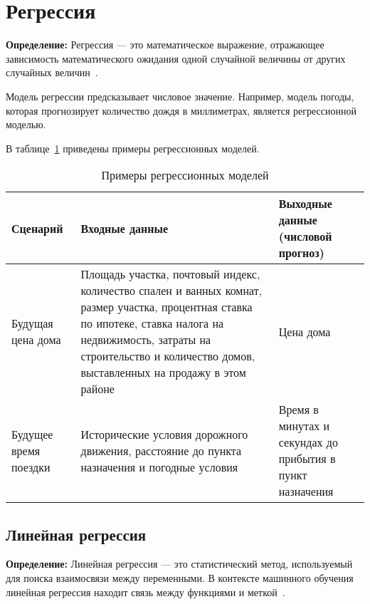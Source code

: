 \section{Регрессия}

\textbf{ Определение:} Регрессия --- это математическое выражение, отражающее зависимость математического ожидания одной случайной величины от других случайных величин~\cite{kemer}.

Модель регрессии предсказывает числовое значение.
Например, модель погоды, которая прогнозирует количество дождя в миллиметрах, является регрессионной моделью.

В таблице~\ref{tab:tabl1} приведены примеры регрессионных моделей.

\begin{table}[ht]
    \centering
    \caption{Примеры регрессионных моделей}
    \begin{tabularx}{\textwidth}{|X|X|X|}
        \hline
        Сценарий & Входные данные & Выходные данные \newline(числовой прогноз) \\
        \hline
        Будущая цена дома & Площадь участка, почтовый индекс, количество спален и ванных комнат, размер участка, процентная ставка по ипотеке, ставка налога на недвижимость, затраты на строительство и количество домов, выставленных на продажу в этом районе & Цена дома \\
        \hline
        Будущее время поездки & Исторические условия дорожного движения, расстояние до пункта назначения и погодные условия & Время в минутах и секундах до прибытия в пункт назначения \\
        \hline
    \end{tabularx}
    \label{tab:tabl1}
\end{table}

\subsection{Линейная регрессия}

\textbf{ Определение:} Линейная регрессия --- это статистический метод, используемый для поиска взаимосвязи между переменными.
В контексте машинного обучения линейная регрессия находит
связь между функциями и меткой~\cite{google}.

